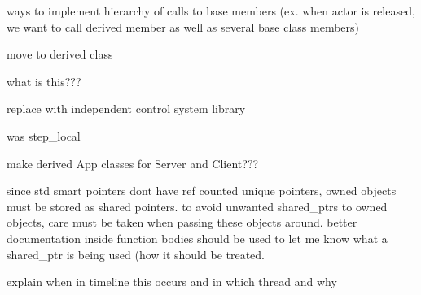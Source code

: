 \begin{DoxyRefList}
ways to implement hierarchy of calls to base members (ex. when actor is released, we want to call derived member as well as several base class members) 
\item[\label{todo__todo000001}%
\hypertarget{todo__todo000001}{}%
\-Member \hyperlink{classNeb_1_1Actor_1_1Base_afc072654755bb4db2e1af77a55e7f8dd}{\-Neb\-:\-:\-Actor\-:\-:\-Base\-:\-:hit} ()]move to derived class  
\item[\label{todo__todo000002}%
\hypertarget{todo__todo000002}{}%
\-Member \hyperlink{classNeb_1_1Actor_1_1Base_ad51160f955b8bff638c938360ff3ce00}{\-Neb\-:\-:\-Actor\-:\-:\-Base\-:\-:mode\-\_\-update\-\_\-} ]what is this???  
\item[\label{todo__todo000003}%
\hypertarget{todo__todo000003}{}%
\-Member \hyperlink{classNeb_1_1Actor_1_1Control_1_1RigidBody_1_1PD_a650c852608792ed70dc28244f3ac4d9d}{\-Neb\-:\-:\-Actor\-:\-:\-Control\-:\-:\-Rigid\-Body\-:\-:\-P\-D\-:\-:step} (double dt)]replace with independent control system library  
\item[\label{todo__todo000004}%
\hypertarget{todo__todo000004}{}%
\-Member \hyperlink{classNeb_1_1Actor_1_1RigidBody_1_1Local_ad0e1a796b0749eb0e3c075dfa93655af}{\-Neb\-:\-:\-Actor\-:\-:\-Rigid\-Body\-:\-:\-Local\-:\-:step} (double const \&time, double const \&dt)]was step\-\_\-local  
\item[\label{todo__todo000007}%
\hypertarget{todo__todo000007}{}%
\-Member \hyperlink{classNeb_1_1App_1_1Base_a347da33116990d3f31246d0d09b520bb}{\-Neb\-:\-:\-App\-:\-:\-Base\-:\-:server\-\_\-} ]make derived \-App classes for \-Server and \-Client???  
\item[\label{todo__todo000006}%
\hypertarget{todo__todo000006}{}%
\-Member \hyperlink{classNeb_1_1App_1_1Base_a4a6527469072e5d1f01f76215b6b2fd3}{\-Neb\-:\-:\-App\-:\-:\-Base\-:\-:window\-\_\-main\-\_\-} ]since std smart pointers dont have ref counted unique pointers, owned objects must be stored as shared pointers. to avoid unwanted shared\-\_\-ptrs to owned objects, care must be taken when passing these objects around. better documentation inside function bodies should be used to let me know what a shared\-\_\-ptr is being used (how it should be treated.  
\item[\label{todo__todo000008}%
\hypertarget{todo__todo000008}{}%
\-Member \hyperlink{classNeb_1_1Graphics_1_1Camera_1_1Projection_1_1Base_ab6e4c68044df250829de3e0cc387de9c}{\-Neb\-:\-:\-Graphics\-:\-:\-Camera\-:\-:\-Projection\-:\-:\-Base\-:\-:step} (double)]explain when in timeline this occurs and in which thread and why  

\end{DoxyRefList}

